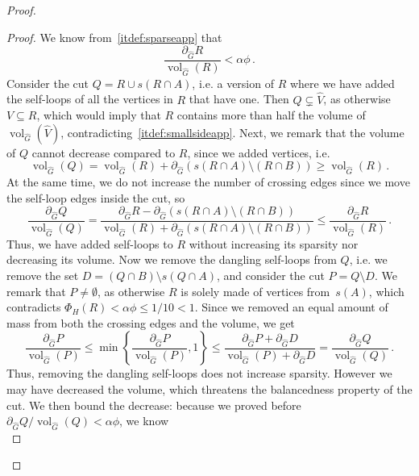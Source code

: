 \documentclass[epsfig,letter,11pt]{article}
\numberwithin{equation}{section}
\DeclareMathOperator{\vol}{vol}
\renewcommand{\hat}{\widehat}
\begin{document}
\begin{proof}
\begin{proof}
	\noindent
	We know from~\eqref{itdef:sparseapp} that
	\begin{equation*}
		\frac{\partial_{\hat{G}} R}{\vol_{\hat{G}} (R)} < \alpha \phi \, .
	\end{equation*}
	Consider the cut $Q=R \cup s(R \cap A)$, i.e. a version of $R$ where we have added the self-loops of all the vertices in $R$ that have one. Then $Q \subsetneq \hat{V}$, as otherwise $V \subseteq R$, which would imply that $R$ contains more than half the volume of $\vol_{\hat{G}}(\hat{V})$, contradicting~\eqref{itdef:smallsideapp}. Next, we remark that the volume of $Q$ cannot decrease compared to $R$, since we added vertices, i.e.
	\begin{equation}
		\label{eq:volrq}
		\vol_{\hat{G}}(Q) = \vol_{\hat{G}}(R) + \partial_{\hat{G}}(s(R \cap A) \setminus (R \cap B)) \ge \vol_{\hat{G}}(R)\, .
	\end{equation}
	At the same time, we do not increase the number of crossing edges since we move the self-loop edges inside the cut, so
	\begin{equation*}
		\frac{\partial_{\hat{G}} Q}{\vol_{\hat{G}}(Q)} = \frac{\partial_{\hat{G}} R - \partial_{\hat{G}}(s(R \cap A) \setminus (R \cap B))}{\vol_{\hat{G}}(R) + \partial_{\hat{G}}(s(R \cap A) \setminus (R \cap B))} \le \frac{\partial_{\hat{G}} R}{\vol_{\hat{G}} (R)} \, .
	\end{equation*}
	Thus, we have added self-loops to $R$ without increasing its sparsity nor decreasing its volume. Now we remove the dangling self-loops from $Q$, i.e. we remove the set $D=(Q \cap B) \setminus s(Q \cap A)$, and consider the cut $P=Q \setminus D$. We remark that $P \neq \emptyset$, as otherwise $R$ is solely made of vertices from~$s(A)$, which contradicts $\Phi_H(R) < \alpha \phi \le 1/10 < 1$. Since we removed an equal amount of mass from both the crossing edges and the volume, we get
	\begin{equation*}
		\frac{\partial_{\hat{G}} P}{\vol_{\hat{G}}(P)} \le \min\left\{\frac{\partial_{\hat{G}} P}{\vol_{\hat{G}}(P)}, 1\right\} \le \frac{\partial_{\hat{G}} P + \partial_{\hat{G}} D}{\vol_{\hat{G}}(P)+\partial_{\hat{G}} D}  = \frac{\partial_{\hat{G}} Q}{\vol_{\hat{G}} (Q)} \, .
	\end{equation*}
	Thus, removing the dangling self-loops does not increase sparsity. However we may have decreased the volume, which threatens the balancedness property of the cut. We then bound the decrease: because we proved before ${\partial_{\hat{G}} Q}/{\vol_{\hat{G}} (Q)} < \alpha \phi$, we know
	\begin{equation*}

\end{equation*}
\end{proof}
\end{proof}
\end{document}
